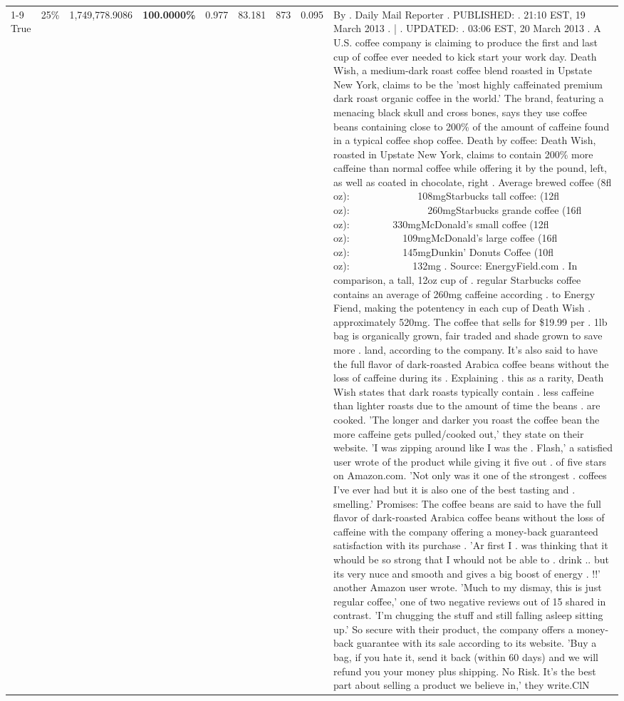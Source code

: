 \begin{table}[H]
{\begin{tabular}{lllrlllll}
\cline{1-9} \cline{2-9}
True & 25\% & 1,749,778.9086 & \bfseries \color{red} 100.0000\% & 0.977 & 83.181 & 873 & 0.095 & By . Daily Mail Reporter . PUBLISHED: . 21:10 EST, 19 March 2013 . | . UPDATED: . 03:06 EST, 20 March 2013 . A U.S. coffee company is claiming to produce the first and last cup of coffee ever needed to kick start your work day. Death Wish, a medium-dark roast coffee blend roasted in Upstate New York, claims to be the 'most highly caffeinated premium dark roast organic coffee in the world.' The brand, featuring a menacing black skull and cross bones, says they use coffee beans containing close to 200\% of the amount of caffeine found in a typical coffee shop coffee. Death by coffee: Death Wish, roasted in Upstate New York, claims to contain 200\% more caffeine than normal coffee while offering it by the pound, left, as well as coated in chocolate, right . Average brewed coffee (8fl oz):              108mgStarbucks tall coffee: (12fl oz):                260mgStarbucks grande coffee (16fl oz):         330mgMcDonald's small coffee (12fl oz):           109mgMcDonald's large coffee (16fl oz):           145mgDunkin' Donuts Coffee (10fl oz):             132mg . Source: EnergyField.com . In comparison, a tall, 12oz cup of . regular Starbucks coffee contains an average of 260mg caffeine according . to Energy Fiend, making the potentency in each cup of Death Wish . approximately 520mg. The coffee that sells for \$19.99 per . 1lb bag is organically grown, fair traded and shade grown to save more . land, according to the company. It's also said to have the full flavor of dark-roasted Arabica coffee beans without the loss of caffeine during its . Explaining . this as a rarity, Death Wish states that dark roasts typically contain . less caffeine than lighter roasts due to the amount of time the beans . are cooked. 'The longer and darker you roast the coffee bean the more caffeine gets pulled/cooked out,' they state on their website. 'I was zipping around like I was the . Flash,' a satisfied user wrote of the product while giving it five out . of five stars on Amazon.com. 'Not only was it one of the strongest . coffees I've ever had but it is also one of the best tasting and . smelling.’ Promises: The coffee beans are said to have the full flavor of dark-roasted Arabica coffee beans without the loss of caffeine with the company offering a money-back guaranteed satisfaction with its purchase . 'Ar first I . was thinking that it whould be so strong that I whould not be able to . drink .. but its very nuce and smooth and gives a big boost of energy . !!' another Amazon user wrote. 'Much to my dismay, this is just regular coffee,' one of two negative reviews out of 15 shared in contrast. 'I'm chugging the stuff and still falling asleep sitting up.' So secure with their product, the company offers a money-back guarantee with its sale according to its website. 'Buy a bag, if you hate it, send it back (within 60 days) and we will refund you your money plus shipping. No Risk. It’s the best part about selling a product we believe in,' they write.ClN \\

\end{tabular}}
\end{table}

